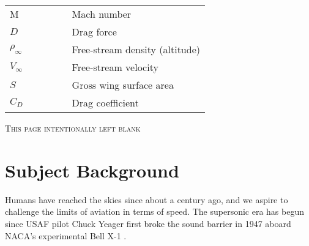 \documentclass[a4paper,11pt]{article}
\begin{document}
\noindent
\begin{tabular}{llllll} %
\vspace{0.75em}
M &&&&& Mach number\\
\vspace{0.75em}
$D$ &&&&& Drag force\\
\vspace{0.75em}
$\rho_{\infty}$ &&&&& Free-stream density (altitude)\\
\vspace{0.75em}
$V_{\infty}$ &&&&& Free-stream velocity\\
\vspace{0.75em}
$S$ &&&&& Gross wing surface area\\
\vspace{0.75em}
$C_{D}$ &&&&& Drag coefficient\\
\end{tabular}

\newpage

\vspace*{\fill}
\begin{center}
\textsc{This page intentionally left blank}
\end{center}
\vspace*{\fill}

\thispagestyle{empty}
\clearpage

\newpage


\setcounter{page}{1}


\section{Subject Background}

Humans have reached the skies since about a century ago, and we aspire to challenge the limits of aviation in terms of speed. The supersonic era has begun since USAF pilot Chuck Yeager first broke the sound barrier in 1947 aboard NACA's experimental Bell X-1 \cite{Smithsonian}.\\
\end{document}
